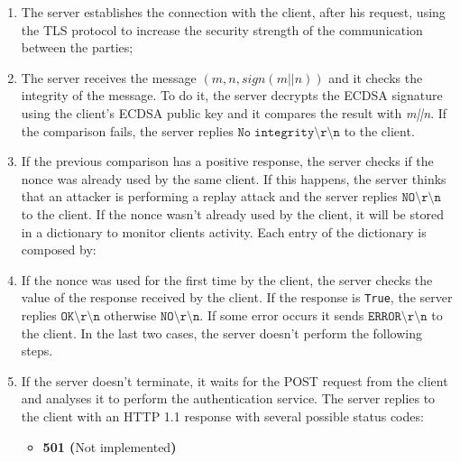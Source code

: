 \begin{enumerate}
\item{The server establishes the connection with the client, after his request, using the TLS protocol to increase the security strength of the communication between the parties;}
\item{The server receives the message $(m, n, sign(m||n))$ and it checks the integrity of the message. To do it, the server decrypts the ECDSA signature using the client's ECDSA public key and it compares the result with \textit{m||n}. If the comparison fails, the server replies $\mathtt{No\;integrity\setminus r\setminus n}$ to the client.}
\item{If the previous comparison has a positive response, the server checks if the nonce was already used by the same client. If this happens, the server thinks that an attacker is performing a replay attack and the server replies $\mathtt{NO\setminus r\setminus n}$ to the client. If the nonce wasn't already used by the client, it will be stored in a dictionary to monitor clients activity. Each entry of the dictionary is composed by:
\begin{itemize}
\end{itemize}
}
\item{If the nonce was used for the first time by the client, the server checks the value of the response received by the client. If the response is \texttt{True}, the server replies $\mathtt{OK\setminus r\setminus n}$ otherwise $\mathtt{NO\setminus r\setminus n}$. If some error occurs it sends $\mathtt{ERROR\setminus r\setminus n}$ to the client. In the last two cases, the server doesn't perform the following steps.}
\item{If the server doesn't terminate, it waits for the POST request from the client and analyses it to perform the authentication service. The server replies to the client with an HTTP 1.1 response with several possible status codes:
\begin{itemize}
\item{\textbf{501 (}Not implemented\textbf{)}\\
}
\end{itemize}}
\end{enumerate}
